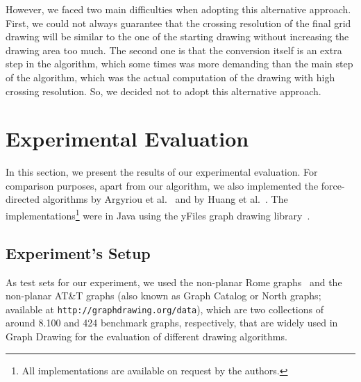 \documentclass{comjnl}
\begin{document}
However, we faced two main difficulties when adopting this alternative approach. First, we could not always guarantee that the crossing resolution of the final grid drawing will be similar to the one of the starting drawing without increasing the drawing area too much. The second one is that the conversion itself is an extra step in the algorithm, which some times was more demanding than the main step of the algorithm, which was the actual computation of the drawing with high crossing resolution. So, we decided not to adopt this alternative approach.

\section{Experimental Evaluation}
\label{sec:experiments}

In this section, we present the results of our experimental evaluation. For comparison purposes, apart from our algorithm, we also implemented the force-directed algorithms by Argyriou et al.~\cite{DBLP:journals/cj/ArgyriouBS13} and by Huang et al.~\cite{DBLP:journals/vlc/HuangEHL13}. The implementations\footnote{All implementations are available on request by the authors.} were in Java using the yFiles graph drawing library~\cite{DBLP:books/sp/04/WieseE004}. 

\subsection{Experiment's Setup}
\label{ssec:setup}

As test sets for our experiment, we used the non-planar Rome graphs~\cite{DBLP:reference/crc/BattistaD13} and the non-planar AT\&T graphs (also known as Graph Catalog or North graphs; available at \texttt{http://graphdrawing.org/data}), which are two collections of around 8.100 and 424 benchmark graphs, respectively, that are widely used in Graph Drawing for the evaluation of different drawing algorithms. 
\end{document}
